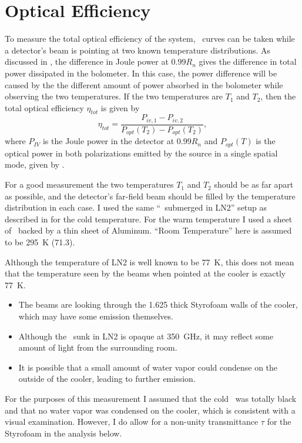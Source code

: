 \section{Optical Efficiency} \label{sec:ch8-opt-eff}

To measure the total optical efficiency of the system, \IV\ curves can be taken while a detector's beam is pointing at two known temperature distributions.
As discussed in , the difference in Joule power at $0.99 R_n$ gives the difference in total power dissipated in the bolometer.
In this case, the power difference will be caused by the the different amount of power absorbed in the bolometer while observing the two temperatures.
If the two temperatures are $T_1$ and $T_2$, then the total optical efficiency $\eta_{tot}$ is given by
\begin{equation}
  \eta_{tot} = \frac{P_{iv,1} - P_{iv,2}}{P_{opt}(T_2) - P_{opt}(T_2)},
\end{equation}
where $P_{IV}$ is the Joule power in the detector at $0.99 R_n$ and $P_{opt}(T)$ is the optical power in both polarizations emitted by the source in a single spatial mode, given by .

For a good measurement the two temperatures $T_1$ and $T_2$ should be as far apart as possible, and the detector's far-field beam should be filled by the temperature distribution in each case.
I used the same ``\ecco\ submerged in LN2'' setup as described in  for the cold temperature.
For the warm temperature I used a sheet of \ecco\ backed by a thin sheet of Aluminum.
``Room Temperature'' here is assumed to be \SI{295}{\kelvin} (\SI{71.3}{\fahrenheit}).

Although the temperature of LN2 is well known to be \SI{77}{\kelvin}, this does not mean that the temperature seen by the beams when pointed at the cooler is exactly \SI{77}{\kelvin}.
\begin{itemize}
  \item The beams are looking through the \SI{1.625}{\in} thick Styrofoam walls of the cooler, which may have some emission themselves.
  \item Although the \ecco\ sunk in LN2 is opaque at \SI{350}{\GHz}, it may reflect some amount of light from the surrounding room.
  \item It is possible that a small amount of water vapor could condense on the outside of the cooler, leading to further emission.
\end{itemize}
For the purposes of this measurement I assumed that the cold \ecco\ was totally black and that no water vapor was condensed on the cooler, which is consistent with a visual examination.
However, I do allow for a non-unity transmittance $\tau$ for the Styrofoam in the analysis below.

